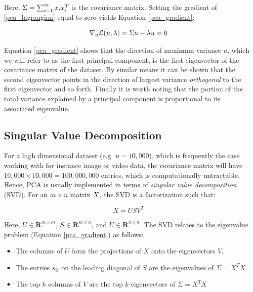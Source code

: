 \documentclass[11pt, oneside, a4paper]{report}
\begin{document}
Here, $\boldmath{\Sigma} = \sum_{i = 1}^m \boldmath{x}_i \boldmath{x}_i^T$ is the covariance matrix. Setting the gradient of \ref{pca_lagrangian} equal to zero yields Equation \ref{pca_gradient}:

\begin{equation}
  \label{pca_gradient}
  \nabla_u \mathcal{L}(\boldmath{u}, \lambda) = \boldmath{\Sigma} \boldmath{u} - \lambda \boldmath{u} = 0
\end{equation}

Equation \ref{pca_gradient} shows that the direction of maximum variance $u$, which we will refer to as the first principal component, is the first eigenvector of the covariance matrix of the dataset. By similar means it can be shown that the second eigenvector points in the direction of largest variance \emph{orthogonal} to the first eigenvector and so forth. Finally it is worth noting that the portion of the total variance explained by a principal component is proportional to its associated eigenvalue.

\subsection{Singular Value Decomposition}

For a high dimensional dataset (e.g. $n = 10,000$), which is
frequently the case working with for instance image or video data, the covariance matrix will have $10,000\times 10,000 = 100,000,000$ entries, which is computationally untractable. Hence, PCA is usually implemented in terms of \emph{singular value decomposition} (SVD). For an $m\times n$ matrix $\boldmath{X}$, the SVD is a factorization such that:

\begin{equation}
  X = US V^{T}
\end{equation}

Here, $U \in \mathbf{R}^{m\times m}$, $S \in \mathbf{R}^{m\times n}$,
and $U \in \mathbf{R}^{n\times n}$. The SVD relates to the eigenvalue
problem (Equation \ref{pca_gradient}) as follows:

\begin{itemize}
\item The columns of $U$ form the projections of $X$ onto the
  eigenvectors $V$.
  \item The entries $s_{ii}$ on the leading diagonal of $S$ are the
    eigenvalues of $\Sigma = X^TX$.
  \item The top $k$ columns of $V$ are the top $k$ eigenvectors of
    $\Sigma = X^T X$
\end{itemize}
\end{document}

